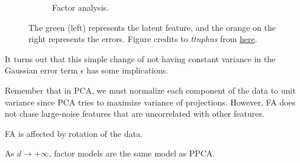 \begin{figure}[H]
    \begin{subfigure}[b]{0.6\textwidth}
      \centering
      \caption{Factor analysis.}
    \end{subfigure}
    \caption{The green (left) represents the latent feature, and the orange on the right represents the errors. Figure credits to \textit{ttnphns} from \href{https://stats.stackexchange.com/questions/1576/what-are-the-differences-between-factor-analysis-and-principal-component-analysi}{here}.}
  \end{figure}

  It turns out that this simple change of not having constant variance in the Gaussian error term $\epsilon$ has some implications. 

  \begin{example}
    \label{ex:scaling-features-does-not-affect-fa}
    Remember that in PCA, we must normalize each component of the data to unit variance since PCA tries to maximize variance of projections. However, FA does not chase large-noise features that are uncorrelated with other features. 
  \end{example}

  \begin{example}
    \label{ex:fa-is-affected-by-rotation-of-data}
    FA is affected by rotation of the data. \cite{2018schmidt}
  \end{example}

  \begin{theorem}
    \label{thm:factor-models-converge-to-ppca-in-high}
    As $d \to +\infty$, factor models are the same model as PPCA. 
  \end{theorem}

